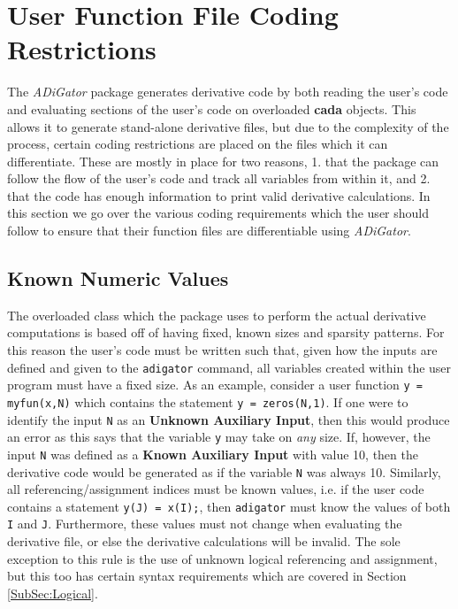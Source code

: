 \documentclass[10pt,pdftex]{article}
\begin{document}
\section{User Function File Coding Restrictions}\label{Sec:Restrictions}
The \emph{ADiGator} package generates derivative code by both reading the user's code and evaluating sections of the user's code on overloaded {\bf cada} objects. This allows it to generate stand-alone derivative files, but due to the complexity of the process, certain coding restrictions are placed on the files which it can differentiate. These are mostly in place for two reasons, 1. that the package can follow the flow of the user's code and track all variables from within it, and 2. that the code has enough information to print valid derivative calculations. In this section we go over the various coding requirements which the user should follow to ensure that their function files are differentiable using \emph{ADiGator}.
\subsection{Known Numeric Values}\label{SubSec:Numeric}
The overloaded class which the package uses to perform the actual derivative computations is based off of having fixed, known sizes and sparsity patterns. For this reason the user's code must be written such that, given how the inputs are defined and given to the \texttt{adigator} command, all variables created within the user program must have a fixed size. As an example, consider a user function \texttt{y = myfun(x,N)} which contains the statement \texttt{y = zeros(N,1)}. If one were to identify the input \texttt{N} as an {\bf Unknown Auxiliary Input}, then this would produce an error as this says that the variable \texttt{y} may take on \emph{any} size. If, however, the input \texttt{N} was defined as a {\bf Known Auxiliary Input} with value 10, then the derivative code would be generated as if the variable \texttt{N} was always 10. Similarly, all referencing/assignment indices must be known values, i.e. if the user code contains a statement \texttt{y(J) = x(I);}, then \texttt{adigator} must know the values of both \texttt{I} and \texttt{J}. Furthermore, these values must not change when evaluating the derivative file, or else the derivative calculations will be invalid. The sole exception to this rule is the use of unknown logical referencing and assignment, but this too has certain syntax requirements which are covered in Section \ref{SubSec:Logical}.
\end{document}
